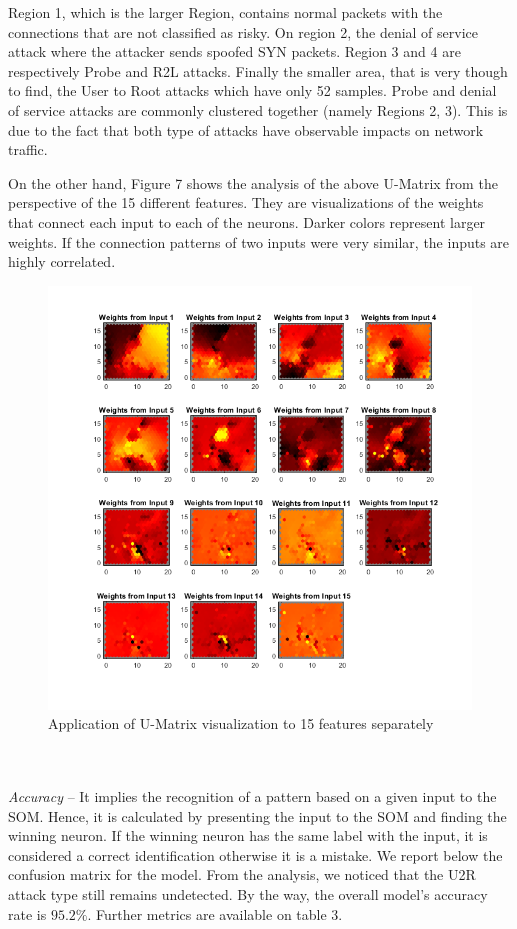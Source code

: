 \documentclass[twocolumn,11pt]{asme2ej}
\begin{document}
Region 1, which is the larger Region, contains normal packets with the connections that are not classified as risky. On region 2, the denial of service attack where the attacker sends spoofed SYN packets. Region 3 and 4 are respectively Probe and R2L attacks. Finally the smaller area, that is very though to find, the User to Root attacks which have only 52 samples. Probe and denial of service attacks are commonly clustered together (namely Regions 2, 3). This is due to the fact that both type of attacks have observable impacts on network traffic.

On the other hand, Figure 7 shows the analysis of the above U-Matrix from the perspective of the 15 different features. They are visualizations of the weights that connect each input to each of the neurons. Darker colors represent larger weights. If the connection patterns of two inputs were very similar, the inputs are highly correlated.
\begin{figure}[h]
\centering
\includegraphics[scale=0.5]{U-Matrix_features.png}
\caption{Application of U-Matrix visualization to 15 features separately}
\end{figure}
\\\\
\textit{Accuracy} -- It implies the recognition of a pattern based on a given input to the SOM. Hence, it is calculated by presenting the input to the SOM and finding the winning neuron. If the winning neuron has the same label with the input, it is considered a correct identification otherwise it is a mistake. We report below the confusion matrix for the model. From the analysis, we noticed that the U2R attack type still remains undetected. By the way, the overall model's accuracy rate is $95.2\%$. Further metrics are available on table 3.
\end{document}
